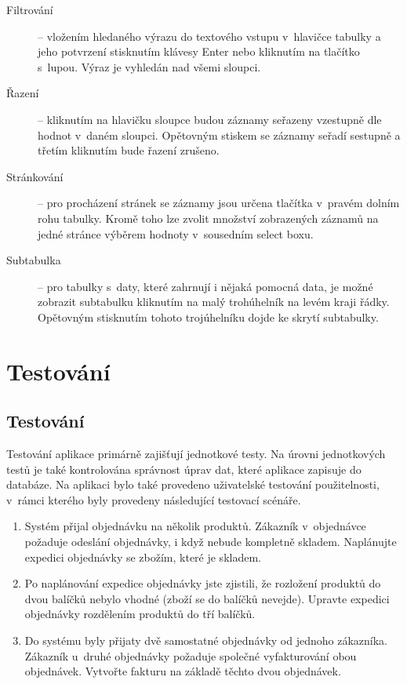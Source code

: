 \documentclass[thesis=B,czech]{FITthesis}[2012/06/26]
\begin{document}
\begin{description}
		\item[Filtrování] -- vložením hledaného výrazu do textového vstupu v~hlavičce tabulky a jeho potvrzení stisknutím klávesy Enter nebo kliknutím na tlačítko s~lupou. Výraz je vyhledán nad všemi sloupci.
		\item[Řazení] -- kliknutím na hlavičku sloupce budou záznamy seřazeny vzestupně dle hodnot v~daném sloupci. Opětovným stiskem se záznamy seřadí sestupně a třetím kliknutím bude řazení zrušeno.
		\item[Stránkování] -- pro procházení stránek se záznamy jsou určena tlačítka v~pravém dolním rohu tabulky. Kromě toho lze zvolit množství zobrazených záznamů na jedné stránce výběrem hodnoty v~sousedním select boxu.
		\item[Subtabulka] -- pro tabulky s~daty, které zahrnují i nějaká pomocná data, je možné zobrazit subtabulku kliknutím na malý trohúhelník na levém kraji řádky. Opětovným stisknutím tohoto trojúhelníku dojde ke skrytí subtabulky.
	\end{description}

\chapter{Testování}

\section{Testování}
	Testování aplikace primárně zajišťují jednotkové testy. Na úrovni jednotkových testů je také kontrolována správnost úprav dat, které aplikace zapisuje do databáze. Na aplikaci bylo také provedeno uživatelské testování použitelnosti, v~rámci kterého byly provedeny následující testovací scénáře.
	\begin{enumerate}
		\item Systém přijal objednávku na několik produktů. Zákazník v~objednávce požaduje odeslání objednávky, i když nebude kompletně skladem. Naplánujte expedici objednávky se zbožím, které je skladem. %
		\item Po naplánování expedice objednávky jste zjistili, že rozložení produktů do dvou balíčků nebylo vhodné (zboží se do balíčků nevejde). Upravte expedici objednávky rozdělením produktů do tří balíčků.
		\item Do systému byly přijaty dvě samostatné objednávky od jednoho zákazníka. Zákazník u~druhé objednávky požaduje společné vyfakturování obou objednávek. Vytvořte fakturu na základě těchto dvou objednávek.
	\end{enumerate}
\end{document}
